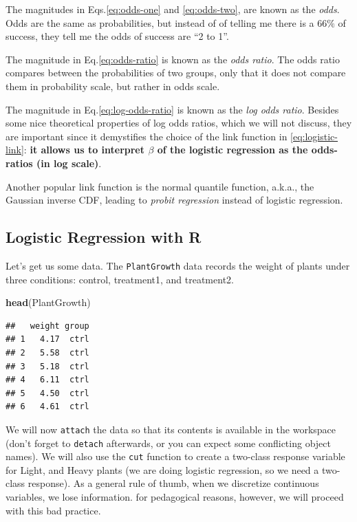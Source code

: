 \documentclass[]{book}
\newenvironment{Shaded}{\begin{snugshade}}{\end{snugshade}}
\newcommand{\KeywordTok}[1]{\textcolor[rgb]{0.13,0.29,0.53}{\textbf{{#1}}}}
\newcommand{\NormalTok}[1]{{#1}}
\theoremstyle{definition}
\theoremstyle{definition}
\theoremstyle{remark}
\begin{document}
The magnitudes in Eqs.\eqref{eq:odds-one} and \eqref{eq:odds-two}, are known
as the \emph{odds}. Odds are the same as probabilities, but instead of
of telling me there is a \(66\%\) of success, they tell me the odds of
success are ``2 to 1''.

The magnitude in Eq.\eqref{eq:odds-ratio} is known as the \emph{odds
ratio}. The odds ratio compares between the probabilities of two groups,
only that it does not compare them in probability scale, but rather in
odds scale.

The magnitude in Eq.\eqref{eq:log-odds-ratio} is known as the \emph{log
odds ratio}. Besides some nice theoretical properties of log odds
ratios, which we will not discuss, they are important since it
demystifies the choice of the link function in \eqref{eq:logistic-link}:
\textbf{it allows us to interpret \(\beta\) of the logistic regression
as the odds-ratios (in log scale)}.

Another popular link function is the normal quantile function, a.k.a.,
the Gaussian inverse CDF, leading to \emph{probit regression} instead of
logistic regression.

\subsection{Logistic Regression with
R}\label{logistic-regression-with-r}

Let's get us some data. The \texttt{PlantGrowth} data records the weight
of plants under three conditions: control, treatment1, and treatment2.

\begin{Shaded}
\begin{Highlighting}[]
\KeywordTok{head}\NormalTok{(PlantGrowth)}
\end{Highlighting}
\end{Shaded}

\begin{verbatim}
##   weight group
## 1   4.17  ctrl
## 2   5.58  ctrl
## 3   5.18  ctrl
## 4   6.11  ctrl
## 5   4.50  ctrl
## 6   4.61  ctrl
\end{verbatim}

We will now \texttt{attach} the data so that its contents is available
in the workspace (don't forget to \texttt{detach} afterwards, or you can
expect some conflicting object names). We will also use the \texttt{cut}
function to create a two-class response variable for Light, and Heavy
plants (we are doing logistic regression, so we need a two-class
response). As a general rule of thumb, when we discretize continuous
variables, we lose information. for pedagogical reasons, however, we
will proceed with this bad practice.
\end{document}
